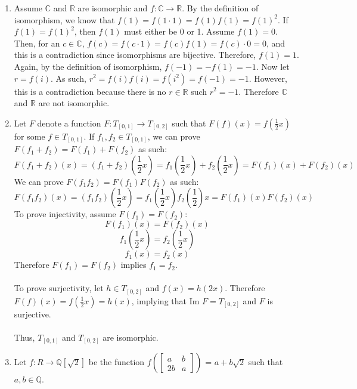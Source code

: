 \documentclass{article}
\begin{document}
\begin{enumerate}
\item Assume $\mathbb{C}$ and $\mathbb{R}$ are isomorphic and
$f: \mathbb{C} \rightarrow \mathbb{R}$.  By the definition of isomorphism,
we know that $f(1) = f(1\cdot1) = f(1)f(1) = f(1)^2$.  If $f(1) = f(1)^2$, then
$f(1)$ must either be 0 or 1.  Assume $f(1) = 0$.  Then, for an $c \in \mathbb{C}$,
$f(c) = f(c\cdot1) = f(c)f(1) = f(c)\cdot0 = 0$, and this is a contradiction since
isomorphisms are bijective.  Therefore, $f(1) = 1$.  Again, by the definition
of isomorphism, $f(-1) = -f(1) = -1$.  Now let $r = f(i)$.  As such,
$r^2 = f(i)f(i) = f(i^2) = f(-1) = -1$.  However, this is a contradiction
because there is no $r \in \mathbb{R}$ such $r^2 = -1$.  Therefore
$\mathbb{C}$ and $\mathbb{R}$ are not isomorphic.

\item Let $F$ denote a function $F: T_{[0,1]} \rightarrow T_{[0,2]}$ such that
$F(f)(x) = f(\frac{1}{2}x)$ for some $f \in T_{[0,1]}$.  If
$f_1, f_2 \in T_{[0,1]}$, we can prove $F(f_1 + f_2) = F(f_1) + F(f_2)$ as such:
\[
F(f_1+f_2)(x) = (f_1+f_2)(\frac{1}{2}x) = f_1(\frac{1}{2}x)+f_2(\frac{1}{2}x) = F(f_1)(x) + F(f_2)(x)
\]
We can prove $F(f_1 f_2) = F(f_1)F(f_2)$ as such:
\[
F(f_1 f_2)(x) = (f_1 f_2)(\frac{1}{2}x) = f_1(\frac{1}{2}x) f_2(\frac{1}{2})x = F(f_1)(x)F(f_2)(x)
\]
To prove injectivity, assume $F(f_1) = F(f_2)$:
\[
F(f_1)(x) = F(f_2)(x)
\] \[
f_1(\frac{1}{2}x) = f_2(\frac{1}{2}x)
\] \[
f_1(x) = f_2(x)
\]
Therefore $F(f_1) = F(f_2)$ implies $f_1 = f_2$. \\ \\
To prove surjectivity, let $h \in T_{[0,2]}$ and $f(x) = h(2x)$.
Therefore $F(f)(x) = f(\frac{1}{2}x) = h(x)$, implying that 
Im $F = T_{[0,2]}$ and $F$ is surjective. \\ \\
Thus, $T_{[0,1]}$ and $T_{[0,2]}$ are isomorphic.

\item Let $f: R \rightarrow \mathbb{Q}[\sqrt{2}]$ be the function
$f(\begin{bmatrix} a & b \\ 2b & a \end{bmatrix})$ = $a + b\sqrt2$ such that
$a, b \in \mathbb{Q}$. \\ \\


\end{enumerate}
\end{document}
